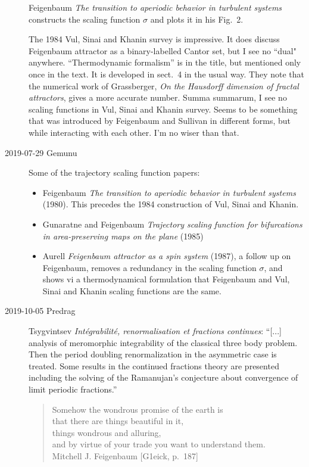 \begin{description}
Feigenbaum {\em The transition to aperiodic behavior in
turbulent systems} constructs the scaling function $\sigma$ and plots it in
his Fig.~2.

The 1984 Vul, Sinai and Khanin survey is impressive. It does
discuss Feigenbaum attractor as a binary-labelled Cantor set, but I see
no ``dual" anywhere. ``Thermodynamic formalism'' is in the title, but
mentioned only once in the text. It is developed in sect.~4 in the usual
way. They note that the numerical work of Grassberger,
{\em On the {Hausdorff} dimension of fractal attractors}, gives a more
accurate number. Summa summarum, I see no scaling functions in Vul, Sinai
and Khanin survey. Seems to be something that was introduced
by Feigenbaum and Sullivan in different forms, but while interacting with
each other. I'm no wiser than that.

\item[2019-07-29 Gemunu]
Some of the trajectory scaling function papers:
\begin{itemize}
  \item
Feigenbaum
{\em The transition to aperiodic behavior in turbulent systems} (1980).
This precedes the 1984 construction
of Vul, Sinai and Khanin.
  \item
Gunaratne and Feigenbaum {\em Trajectory scaling function
for bifurcations in area-preserving maps on the plane} (1985)
  \item
Aurell
{\em Feigenbaum attractor as a spin system} (1987),
a follow up on Feigenbaum, removes a redundancy in
the scaling function $\sigma$, and shows vi a thermodynamical formulation
that Feigenbaum and Vul, Sinai and Khanin
scaling functions are the same.
\end{itemize}

\item[2019-10-05 Predrag]
Tsygvintsev
{\em Int{\'e}grabilit{\'e}, renormalisation et fractions continues}:
``[...] analysis of meromorphic integrability of the classical three body
problem. Then the period doubling renormalization in the asymmetric case
is treated. Some results in the continued fractions theory are presented
including the solving of the Ramanujan's conjecture about convergence of
limit periodic fractions.''

\begin{quote}
Somehow the wondrous promise of the earth is \\
that there are things beautiful in  it, \\
things wondrous and alluring, \\
and by virtue of your trade you want to understand them. \\
Mitchell J.  Feigenbaum [G1eick, p.~187]
\end{quote}
\end{description}



\printbibliography[heading=subbibintoc,title={References}]
